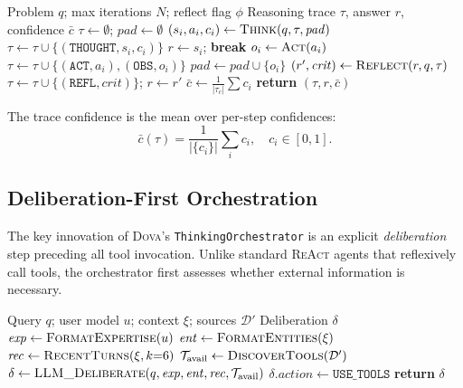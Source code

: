 \documentclass{article}
\theoremstyle{plain}
\theoremstyle{definition}
\newcommand{\algorithmicreturn}{\textbf{return}}
\newcommand{\RETURN}{\STATE \algorithmicreturn{} }
\newcommand{\dova}{\textsc{Dova}}
\newcommand{\react}{\textsc{ReAct}}
\begin{document}
\begin{algorithm}[ht!]
\caption{ReAct Reasoning with Self-Reflection}
\label{alg:react}
\begin{algorithmic}
\REQUIRE Problem $q$; max iterations $N$; reflect flag $\phi$
\ENSURE Reasoning trace $\tau$, answer $r$, confidence $\bar{c}$
\STATE $\tau \leftarrow \emptyset$; $\mathit{pad} \leftarrow \emptyset$
  \STATE $(s_i, a_i, c_i) \leftarrow \textsc{Think}(q, \tau, \mathit{pad})$
  \STATE $\tau \leftarrow \tau \cup \{(\texttt{THOUGHT}, s_i, c_i)\}$
    \STATE $r \leftarrow s_i$; \textbf{break}
  \ENDIF
  \STATE $o_i \leftarrow \textsc{Act}(a_i)$ 
  \STATE $\tau \leftarrow \tau \cup \{(\texttt{ACT}, a_i), (\texttt{OBS}, o_i)\}$
  \STATE $\mathit{pad} \leftarrow \mathit{pad} \cup \{o_i\}$
\ENDFOR
{}
  \STATE $(r', \mathit{crit}) \leftarrow \textsc{Reflect}(r, q, \tau)$
  \STATE $\tau \leftarrow \tau \cup \{(\texttt{REFL}, \mathit{crit})\}$; $r \leftarrow r'$
\ENDIF
\STATE $\bar{c} \leftarrow \frac{1}{|\tau_c|}\sum c_i$
\RETURN $(\tau, r, \bar{c})$
\end{algorithmic}
\end{algorithm}

The trace confidence is the mean over per-step confidences:
\begin{equation}\label{eq:trace_confidence}
  \bar{c}(\tau) = \frac{1}{|\{c_i\}|} \sum_{i} c_i, \quad c_i \in [0, 1].
\end{equation}

\subsection{Deliberation-First Orchestration}\label{sec:deliberation}

The key innovation of \dova{}'s \texttt{ThinkingOrchestrator} is an explicit
\emph{deliberation} step preceding all tool invocation.  Unlike standard
\react{} agents that reflexively call tools, the orchestrator first assesses
whether external information is necessary.

\begin{algorithm}[ht!]
\caption{Deliberation-First Orchestration}
\label{alg:deliberation}
\begin{algorithmic}
\REQUIRE Query $q$; user model $u$; context $\xi$; sources $\mathcal{D}'$
\ENSURE Deliberation $\delta$
\STATE $\mathit{exp} \leftarrow \textsc{FormatExpertise}(u)$
\STATE $\mathit{ent} \leftarrow \textsc{FormatEntities}(\xi)$
\STATE $\mathit{rec} \leftarrow \textsc{RecentTurns}(\xi, k{=}6)$
\STATE $\mathcal{T}_\mathrm{avail} \leftarrow \textsc{DiscoverTools}(\mathcal{D}')$
\STATE $\delta \leftarrow \textsc{LLM\_Deliberate}(q, \mathit{exp}, \mathit{ent}, \mathit{rec}, \mathcal{T}_\mathrm{avail})$
  \STATE $\delta.\mathit{action} \leftarrow \texttt{USE\_TOOLS}$
\ENDIF
\RETURN $\delta$
\end{algorithmic}
\end{algorithm}
\end{document}
